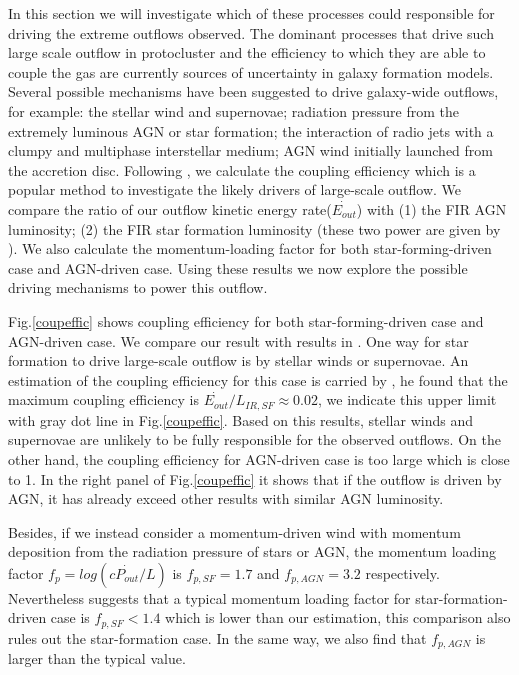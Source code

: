 	In this section we will investigate which of these processes could responsible for driving the extreme outflows observed. The dominant processes that drive such large scale outflow in protocluster and the efficiency to which they are able to couple the gas are currently sources of uncertainty in galaxy formation models. Several possible mechanisms have been suggested to drive galaxy-wide outflows, for example: the stellar wind and supernovae; radiation pressure from the extremely luminous AGN or star formation; the interaction of radio jets with a clumpy and multiphase interstellar medium; AGN wind initially launched from the accretion disc. Following \cite{harrison2014kiloparsec}, we calculate the coupling efficiency which is a popular method to investigate the likely drivers of large-scale outflow. We compare the ratio of our outflow kinetic energy rate($\dot{E_{out}}$) with (1) the FIR AGN luminosity; (2) the FIR star formation luminosity (these two power are given by \cite{arrigoni2018qso}). We also calculate the momentum-loading factor for both star-forming-driven case and AGN-driven case. Using these results we now explore the possible driving mechanisms to power this outflow. 
	 
	 Fig.\ref{coupeffic} shows coupling efficiency for both star-forming-driven case and AGN-driven case. We compare our result with results in \cite{harrison2014kiloparsec}. One way for star formation to drive large-scale outflow is by stellar winds or supernovae. An estimation of the coupling efficiency for this case is carried by \cite{kennicutt1998star}, he found that the maximum coupling efficiency is $\dot{E_{out}}/L_{IR,SF} \approx 0.02$, we indicate this upper limit with gray dot line in Fig.\ref{coupeffic}. Based on this results, stellar winds and supernovae are unlikely to be fully responsible for the observed outflows. On the other hand, the coupling efficiency for AGN-driven case is too large which is close to 1. In the right panel of Fig.\ref{coupeffic} it shows that if the outflow is driven by AGN, it has already exceed other results with similar AGN luminosity. 
	 
	 Besides, if we instead consider a momentum-driven wind with momentum deposition from the radiation pressure of stars or AGN, the momentum loading factor $f_{p}=log(c\dot{P_{out}}/L)$ is $f_{p,SF}=1.7$ and $f_{p,AGN}=3.2$ respectively. Nevertheless \cite{zubovas2018agn} suggests that a typical momentum loading factor for star-formation-driven case is $f_{p,SF}< 1.4$ which is lower than our estimation, this comparison also rules out the star-formation case. In the same way, we also find that $f_{p,AGN}$ is larger than the typical value. 
	 
